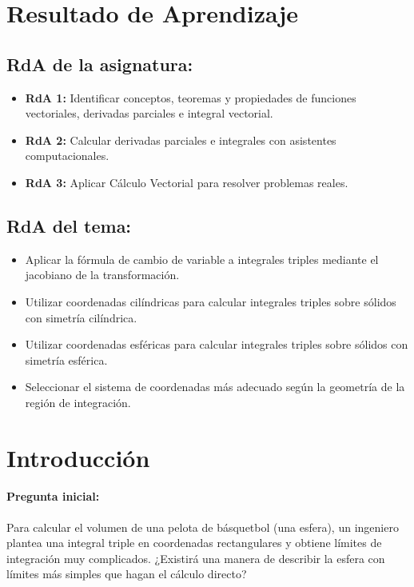 \documentclass[a4,11pt]{aleph-notas}
\begin{document}
\encabezado

\section*{Resultado de Aprendizaje}

\subsection*{RdA de la asignatura:}
\begin{itemize}[leftmargin=*]
    \item \textbf{RdA 1:} Identificar conceptos, teoremas y propiedades de funciones vectoriales, derivadas parciales e integral vectorial.
    \item \textbf{RdA 2:} Calcular derivadas parciales e integrales con asistentes computacionales.
    \item \textbf{RdA 3:} Aplicar Cálculo Vectorial para resolver problemas reales.
\end{itemize}

\subsection*{RdA del tema:}
\begin{itemize}[leftmargin=*]
    \item Aplicar la fórmula de cambio de variable a integrales triples mediante el jacobiano de la transformación.
    \item Utilizar coordenadas cilíndricas para calcular integrales triples sobre sólidos con simetría cilíndrica.
    \item Utilizar coordenadas esféricas para calcular integrales triples sobre sólidos con simetría esférica.
    \item Seleccionar el sistema de coordenadas más adecuado según la geometría de la región de integración.
\end{itemize}

\section*{Introducción}

\paragraph{Pregunta inicial:}
Para calcular el volumen de una pelota de básquetbol (una esfera), un ingeniero plantea una integral triple en coordenadas rectangulares y obtiene límites de integración muy complicados. ¿Existirá una manera de describir la esfera con límites más simples que hagan el cálculo directo?
\end{document}
